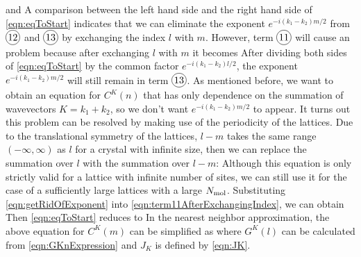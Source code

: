 and 
A comparison between the left hand side and the right hand side of \autoref{eqn:eqToStart} indicates that 
we can eliminate the exponent $e^{- i (k_1 - k_2 ) m /2}$ from $\text{\circled{12}}$ and $\text{\circled{13}}$ by
 exchanging the index $l$ with $m$. However, term $\text{\circled{11}}$ will cause an problem because after 
exchanging $l$ with $m$ it becomes
After dividing both sides of \autoref{eqn:eqToStart} by the common factor $e^{- i (k_1 - k_2 ) l /2}$, the exponent
$e^{-i(k_1 - k_2 )m/2}$ will still remain in term  $\text{\circled{13}}$. As mentioned before, we want to obtain an 
equation for $C^{K}(n)$ that has only dependence on the summation of wavevectors $K = k_1 + k_2$, so we don't 
want $e^{-i(k_1 - k_2 )m/2}$ to appear. It turns out this problem can be resolved by making use of the periodicity of
 the lattices. Due to the translational symmetry of the lattices, $l-m$ takes the same range $(-\infty, \infty)$ as $l$ for
a crystal with infinite size, then we can replace the summation over $l$ with the summation over $l-m$:
Although this equation is only strictly valid for a lattice with infinite number of sites, we can still use it for the case
of a sufficiently large lattices with a large $N_{\rm mol}$.  Substituting \autoref{eqn:getRidOfExponent} into 
\autoref{eqn:term11AfterExchangingIndex}, we can obtain
Then  \autoref{eqn:eqToStart} reduces to
In the nearest neighbor approximation, the above equation for $C^{K}(m)$ can be simplified as
where  $G^{K}(l)$ can be calculated from \autoref{eqn:GKnExpression} and $J_K$ is defined by \autoref{eqn:JK}. 

